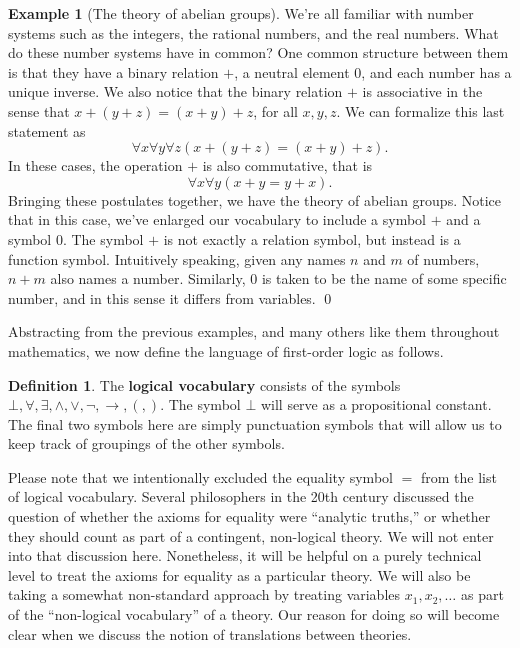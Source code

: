 \documentclass[11pt,fleqn]{article}
\theoremstyle{definition}
\newtheorem*{defn}{Definition}
\newtheorem*{example}{Example}
\theoremstyle{remark}
\newcommand{\2}{\mathscr}
\newcounter{axi}\setcounter{axi}{0}
\begin{document}

\begin{example}[The theory of abelian groups] We're all familiar with
  number systems such as the integers, the rational numbers, and the
  real numbers.  What do these number systems have in common?  One
  common structure between them is that they have a binary relation
  $+$, a neutral element $0$, and each number has a unique inverse.
  We also notice that the binary relation $+$ is associative in the
  sense that $x+(y+z)=(x+y)+z$, for all $x,y,z$.  We can formalize
  this last statement as
  \[ \forall x\forall y\forall z(x+(y+z)=(x+y)+z) .\]
  In these cases, the operation $+$ is also commutative, that is
  \[ \forall x\forall y(x+y=y+x ) .\] Bringing these postulates
  together, we have the theory of abelian groups.  Notice that in this
  case, we've enlarged our vocabulary to include a symbol $+$ and a
  symbol $0$.  The symbol $+$ is not exactly a relation symbol, but
  instead is a function symbol.  Intuitively speaking, given any names
  $n$ and $m$ of numbers, $n+m$ also names a number.  Similarly, $0$
  is taken to be the name of some specific number, and in this sense
  it differs from variables. \hfill \qed 
\end{example}

Abstracting from the previous examples, and many others like them
throughout mathematics, we now define the language of first-order
logic as follows.

\begin{defn} The \textbf{logical vocabulary} consists of the symbols
  $\bot,\forall ,\exists ,\wedge ,\vee ,\neg ,\to ,(, )$.  The symbol
  $\bot$ will serve as a propositional constant.  The final two
  symbols here are simply punctuation symbols that will allow us to
  keep track of groupings of the other symbols. \end{defn}

Please note that we intentionally excluded the equality symbol $=$
from the list of logical vocabulary.  Several philosophers in the 20th
century discussed the question of whether the axioms for equality were
``analytic truths,'' or whether they should count as part of a
contingent, non-logical theory.  We will not enter into that
discussion here.  Nonetheless, it will be helpful on a purely
technical level to treat the axioms for equality as a particular
theory.  We will also be taking a somewhat non-standard approach by
treating variables $x_1,x_2,\dots $ as part of the ``non-logical
vocabulary'' of a theory.  Our reason for doing so will become clear
when we discuss the notion of translations between theories.
\end{document}
